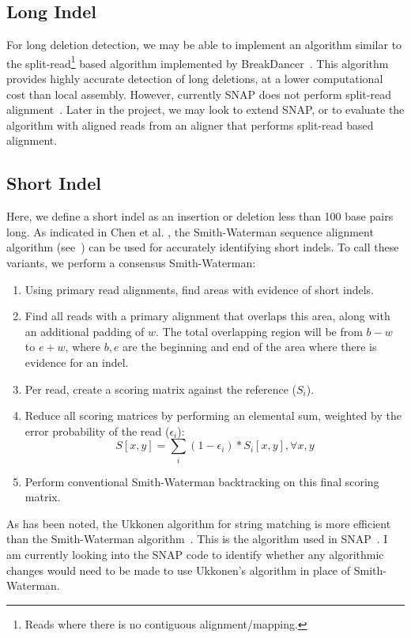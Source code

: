 \documentclass[11pt]{article}
\begin{document}
\subsection{Long Indel}
\label{sec:long-indel}

For long deletion detection, we may be able to implement an algorithm similar to the split-read\footnote{Reads where
there is no contiguous alignment/mapping.} based algorithm implemented by BreakDancer~\cite{chen09}. This
algorithm provides highly accurate detection of long deletions, at a lower computational cost than local assembly.
However, currently SNAP does not perform split-read alignment~\cite{zaharia11}. Later in the project, we may
look to extend SNAP, or to evaluate the algorithm with aligned reads from an aligner that performs split-read based
alignment.

\subsection{Short Indel}
\label{sec:short-indel}

Here, we define a short indel as an insertion or deletion less than 100 base pairs long. As indicated in Chen et al.
\cite{chen09}, the Smith-Waterman sequence alignment algorithm (see~\cite{smith81}) can be used for accurately
identifying short indels. To call these variants, we perform a consensus Smith-Waterman:

\begin{enumerate}
\item Using primary read alignments, find areas with evidence of short indels.
\item Find all reads with a primary alignment that overlaps this area, along with an additional padding of $w$. The total
overlapping region will be from $b - w$ to $e + w$, where $b, e$ are the beginning and end of the area where there is
evidence for an indel.
\item Per read, create a scoring matrix against the reference ($S_i$).
\item Reduce all scoring matrices by performing an elemental sum, weighted by the error probability of the read
($\epsilon_i$):
$$
S [x, y] = \sum_i (1 - \epsilon_i) * S_i [x,y] , \forall x, y
$$
\item Perform conventional Smith-Waterman backtracking on this final scoring matrix.
\end{enumerate}

As has been noted, the Ukkonen algorithm for string matching is more efficient than the Smith-Waterman
algorithm~\cite{ukkonen85}. This is the algorithm used in SNAP~\cite{zaharia11}. I am currently looking into the SNAP
code to identify whether any algorithmic changes would need to be made to use Ukkonen's algorithm in place of
Smith-Waterman.
\end{document}

